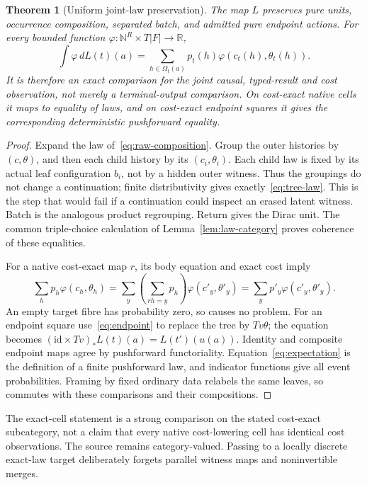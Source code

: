 \documentclass[11pt,a4paper]{article}
\newtheorem{theorem}{Theorem}[section]
\theoremstyle{definition}
\newcommand{\id}{\mathrm{id}}
\begin{document}
\begin{theorem}[Uniform joint-law preservation]\label{thm:comparison}
The map $L$ preserves pure units, occurrence composition, separated batch,
and admitted pure endpoint actions. For every bounded function
$\varphi:\mathbb N^R\times T|F|\to\mathbb R$,
\begin{equation}\label{eq:expectation}
 \int\varphi\,dL(t)(a)
 =\sum_{h\in\Omega_t(a)}p_t(h)
                    \varphi(c_t(h),\theta_t(h)).
\end{equation}
It is therefore an exact comparison for the joint causal, typed-result and
cost observation, not merely a terminal-output comparison. On cost-exact
native cells it maps to equality of laws, and on cost-exact endpoint squares
it gives the corresponding deterministic pushforward equality.
\end{theorem}
\begin{proof}
Expand the law of~\eqref{eq:raw-composition}. Group the outer histories by
$(c,\theta)$, and then each child history by its $(c_i,\theta_i)$. Each
child law is fixed by its actual leaf configuration $b_i$, not by a hidden
outer witness. Thus the groupings do not change a continuation; finite
distributivity gives exactly~\eqref{eq:tree-law}. This is the step that
would fail if a continuation could inspect an erased latent witness.
Batch is the analogous product regrouping. Return gives the Dirac unit.
The common triple-choice calculation of Lemma~\ref{lem:law-category}
proves coherence of these equalities.

For a native cost-exact map $r$, its body equation and exact cost imply
\[
 \sum_h p_h\varphi(c_h,\theta_h)
 =\sum_y\left(\sum_{rh=y}p_h\right)
                 \varphi(c'_y,\theta'_y)
 =\sum_y p'_y\varphi(c'_y,\theta'_y).
\]
An empty target fibre has probability zero, so causes no problem. For an
endpoint square use~\eqref{eq:endpoint} to replace the tree by $Tv\theta$;
the equation becomes
$(\id\times Tv)_*L(t)(a)=L(t')(u(a))$. Identity and composite endpoint
maps agree by pushforward functoriality. Equation~\eqref{eq:expectation}
is the definition of a finite pushforward law, and indicator functions give
all event probabilities. Framing by fixed ordinary data relabels the same
leaves, so commutes with these comparisons and their compositions.
\end{proof}
The exact-cell statement is a strong comparison on the stated cost-exact
subcategory, not a claim that every native cost-lowering cell has identical
cost observations. The source remains category-valued. Passing to a locally
discrete exact-law target deliberately forgets parallel witness maps and
noninvertible merges.
\end{document}
